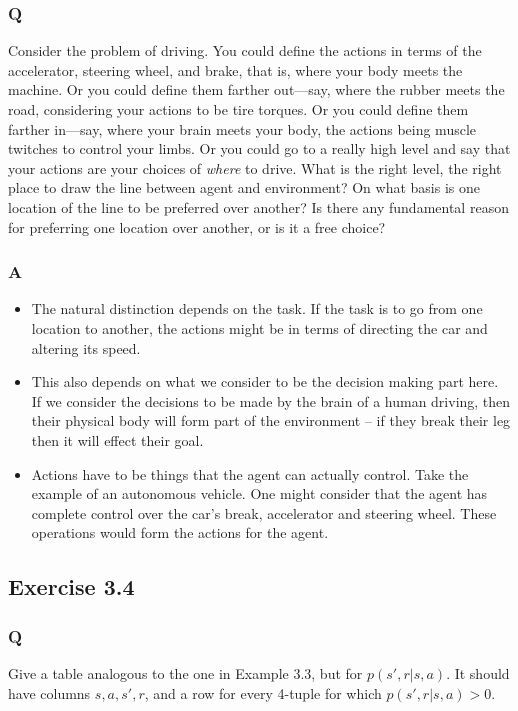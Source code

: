 \subsubsection{Q}
Consider the problem of driving. You could define the actions in terms of the accelerator, steering wheel, and brake, that is, where your body meets the machine. Or you could define them farther out—say, where the rubber meets the road, considering your actions to be tire torques. Or you could define them farther in—say, where your brain meets your body, the actions being muscle twitches to control your limbs. Or you could go to a really high level and say that your actions are your choices of \emph{where} to drive. What is the right level, the right place to draw the line between agent and environment? On what basis is one location of the line to be preferred over another? Is there any fundamental reason for preferring one location over another, or is it a free choice?

\subsubsection{A}

\begin{itemize}
    \item The natural distinction depends on the task. If the task is to go from one location to another, the actions might be in terms of directing the car and altering its speed. 
    \item This also depends on what we consider to be the decision making part here. If we consider the decisions to be made by the brain of a human driving, then their physical body will form part of the environment -- if they break their leg then it will effect their goal.
    \item Actions have to be things that the agent can actually control. Take the example of an autonomous vehicle. One might consider that the agent has complete control over the car's break, accelerator and steering wheel. These operations would form the actions for the agent. 
\end{itemize}


\subsection{Exercise 3.4}
\subsubsection{Q}
Give a table analogous to the one in Example 3.3, but for $p(s', r| s, a)$. It should have columns $s, a, s', r$, and a row for every 4-tuple for which $p(s', r | s, a) > 0$.

